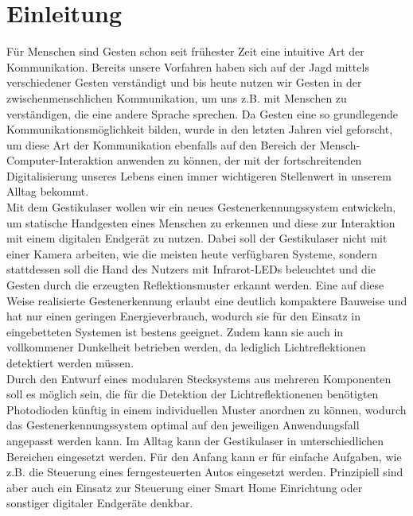 \chapter{Einleitung}
\label{ch:Einleitung}

Für Menschen sind Gesten schon seit frühester Zeit eine intuitive Art der Kommunikation. Bereits unsere Vorfahren haben sich auf der Jagd mittels verschiedener Gesten verständigt und bis heute nutzen wir Gesten in der zwischenmenschlichen Kommunikation, um uns z.B. mit Menschen zu verständigen, die eine andere Sprache sprechen. Da Gesten eine so grundlegende Kommunikationsmöglichkeit bilden, wurde in den letzten Jahren viel geforscht, um diese Art der Kommunikation ebenfalls auf den Bereich der Mensch-Computer-Interaktion anwenden zu können, der mit der fortschreitenden Digitalisierung unseres Lebens einen immer wichtigeren Stellenwert in unserem Alltag bekommt.\\
Mit dem Gestikulaser wollen wir ein neues Gestenerkennungssystem entwickeln, um statische Handgesten eines Menschen zu erkennen und diese zur Interaktion mit einem digitalen Endgerät zu nutzen. Dabei soll der Gestikulaser nicht mit einer Kamera arbeiten, wie die meisten heute verfügbaren Systeme, sondern stattdessen soll die Hand des Nutzers mit Infrarot-LEDs beleuchtet und die Gesten durch die erzeugten Reflektionsmuster erkannt werden. Eine auf diese Weise realisierte Gestenerkennung erlaubt eine deutlich kompaktere Bauweise und hat nur einen geringen Energieverbrauch, wodurch sie für den Einsatz in eingebetteten Systemen ist bestens geeignet. Zudem kann sie auch in vollkommener Dunkelheit betrieben werden, da lediglich Lichtreflektionen detektiert werden müssen. \\
Durch den Entwurf eines modularen Stecksystems aus mehreren Komponenten soll es möglich sein, die für die Detektion der Lichtreflektionenen benötigten Photodioden künftig in einem individuellen Muster anordnen zu können, wodurch das Gestenerkennungssystem optimal auf den jeweiligen Anwendungsfall angepasst werden kann. Im Alltag kann der Gestikulaser in unterschiedlichen Bereichen eingesetzt werden. Für den Anfang kann er für einfache Aufgaben, wie z.B. die Steuerung eines ferngesteuerten Autos eingesetzt werden. Prinzipiell sind aber auch ein Einsatz zur Steuerung einer Smart Home Einrichtung oder sonstiger digitaler Endgeräte denkbar.